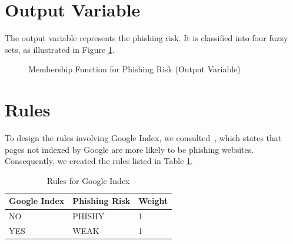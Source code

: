 \documentclass[11pt]{article}
\begin{document}
\section{Output Variable}
The output variable represents the phishing risk. It is classified into four fuzzy sets, as illustrated in Figure \ref{output_variable}.

\begin{figure}[H]
    \centering
    \caption{Membership Function for Phishing Risk (Output Variable)}
    \label{output_variable}
\end{figure}



\section{Rules}

To design the rules involving Google Index, we consulted~\cite{mainpaper}, which states that pages not indexed by Google are more likely to be phishing websites. Consequently, we created the rules listed in Table \ref{google_index_rules}.

\begin{table}[H]
    \centering
    \begin{tabular}{|l|l|l|}
        \hline
        \textbf{Google Index} & \textbf{Phishing Risk} & \textbf{Weight} \\ \hline
        NO                    & PHISHY                 & 1               \\ \hline
        YES                   & WEAK                   & 1               \\ \hline
    \end{tabular}
    \caption{Rules for Google Index}
    \label{google_index_rules}
\end{table}
\end{document}

